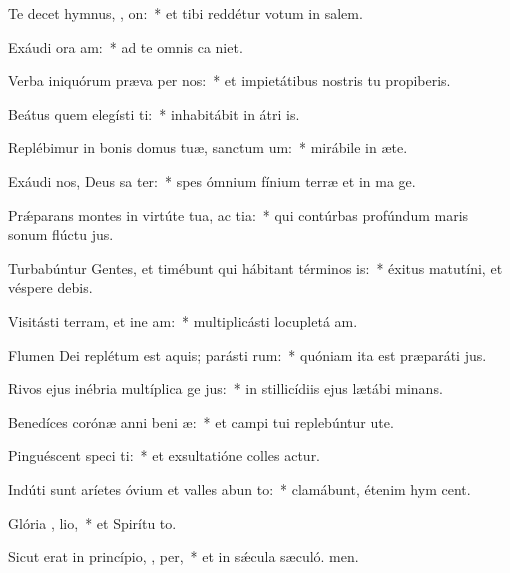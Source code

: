 \item Te decet hymnus, ,  on:~* et tibi reddétur votum in salem.
\item Exáudi ora am:~* ad te omnis ca niet.
\item Verba iniquórum præva per nos:~* et impietátibus nostris tu propiberis.
\item Beátus quem elegísti  ti:~* inhabitábit in átri is.
\item Replébimur in bonis domus tuæ, sanctum   um:~* mirábile in æte.
\item Exáudi nos, Deus sa ter:~* spes ómnium fínium terræ et in ma ge.
\item Prǽparans montes in virtúte tua, ac tia:~* qui contúrbas profúndum maris sonum flúctu jus.
\item Turbabúntur Gentes, et timébunt qui hábitant términos   is:~* éxitus matutíni, et véspere debis.
\item Visitásti terram, et ine am:~* multiplicásti locupletá am.
\item Flumen Dei replétum est aquis; parásti  rum:~* quóniam ita est præparáti jus.
\item Rivos ejus inébria multíplica ge jus:~* in stillicídiis ejus lætábi minans.
\item Benedíces corónæ anni beni æ:~* et campi tui replebúntur ute.
\item Pinguéscent speci ti:~* et exsultatióne colles actur.
\item Indúti sunt aríetes óvium et valles abun to:~* clamábunt, étenim hym cent.
\item Glória ,  lio,~* et Spirítu to.
\item Sicut erat in princípio,  ,  per,~* et in sǽcula sæculó. men.
